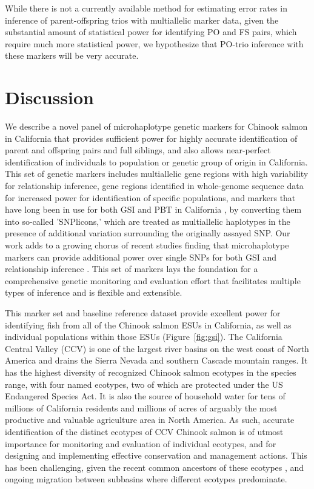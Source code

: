 While there is not a currently available method \citep[like that of][]{anderson2006power} for estimating error rates in
inference of parent-offspring trios with multiallelic marker data, given the substantial amount of statistical power for identifying
PO and FS pairs, which 
require much more statistical power, we hypothesize that PO-trio inference with these markers will be very accurate.








\section*{Discussion}

We describe a novel panel of microhaplotype genetic markers for Chinook salmon
in California that provides sufficient power for highly accurate identification 
of parent and offspring pairs and full siblings, and also allows near-perfect
identification of individuals to population or genetic group of origin in California. 
This set of genetic markers includes multiallelic gene regions with high variability for
relationship inference, gene regions identified in whole-genome sequence data
for increased power for identification of specific populations, and markers that have
long been in use for both GSI and PBT in California \citep{clemento2014evaluation}, by converting them
into so-called 'SNPlicons,' which are treated as multiallelic haplotypes in the presence
of additional variation surrounding the originally assayed SNP\@. Our work adds to a growing
chorus of recent studies finding that microhaplotype markers can provide additional
power over single SNPs for both GSI \citep{mckinney2017managing,mckinney2022new,hargrove2024efficient} and
relationship inference \citep{baetscher2018microhaplotypes,bootsma2020gt,delomas2024microhaplotypes}.
This set of markers lays the foundation for a comprehensive 
genetic monitoring and evaluation effort that facilitates multiple types of inference 
and is flexible and extensible.


This marker set and baseline reference dataset provide
excellent power for identifying fish from all of the Chinook salmon ESUs in California,
as well as individual populations within those ESUs (Figure~\ref{fig:gsi}).
The California Central Valley (CCV) is one of the largest river
basins on the west coast of North America and drains the Sierra Nevada and southern Cascade
mountain ranges. It has the highest diversity of recognized Chinook salmon
ecotypes in the species range, with four named ecotypes, two of which are protected
under the US Endangered Species Act. It is also the source of household water for
tens of millions of California residents and millions of acres of arguably
the most productive and valuable agriculture area in North America. As such, accurate identification of the distinct 
ecotypes of CCV Chinook salmon is of utmost importance for monitoring and
evaluation of individual ecotypes, and for designing and implementing
effective conservation and management actions. This has been challenging,
given the recent common ancestors of these ecotypes \citep{clemento2014evaluation}, and
ongoing migration between subbasins where different ecotypes predominate.

